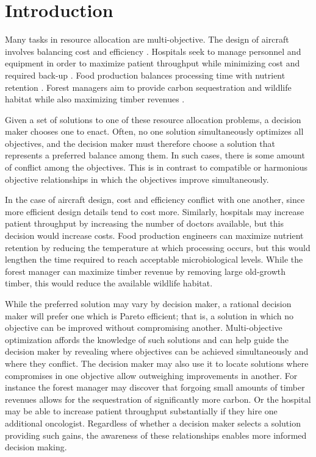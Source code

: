 
\section{Introduction}
\label{sec:intro}

Many tasks in resource allocation are multi-objective. The design of aircraft involves balancing cost and efficiency \cite{wang2014multi}. Hospitals seek to manage personnel and equipment in order to maximize patient throughput while minimizing cost and required back-up \cite{hutzschenreuter2009evolutionary}. Food production balances processing time with nutrient retention \cite{sendin2010efficient}. Forest managers aim to provide carbon sequestration and wildlife habitat while also maximizing timber revenues \cite{toth2013ecosel}.

Given a set of solutions to one of these resource allocation problems, a decision maker chooses one to enact. Often, no one solution simultaneously optimizes all objectives, and the decision maker must therefore choose a solution that represents a preferred balance among them. In such cases, there is some amount of conflict among the objectives. This is in contrast to compatible or harmonious objective relationships in which the objectives improve simultaneously.

In the case of aircraft design, cost and efficiency conflict with one another, since more efficient design details tend to cost more. Similarly, hospitals may increase patient throughput by increasing the number of doctors available, but this decision would increase costs. Food production engineers can maximize nutrient retention by reducing the temperature at which processing occurs, but this would lengthen the time required to reach acceptable microbiological levels. While the forest manager can maximize timber revenue by removing large old-growth timber, this would reduce the available wildlife habitat.

While the preferred solution may vary by decision maker, a rational decision maker will prefer one which is Pareto efficient; that is, a solution in which no objective can be improved without compromising another. Multi-objective optimization affords the knowledge of such solutions and can help guide the decision maker by revealing where objectives can be achieved simultaneously and where they conflict. The decision maker may also use it to locate solutions where compromises in one objective allow outweighing improvements in another. For instance the forest manager may discover that forgoing small amounts of timber revenues allows for the sequestration of significantly more carbon. Or the hospital may be able to increase patient throughput substantially if they hire one additional oncologist.
Regardless of whether a decision maker selects a solution providing such gains, the awareness of these relationships enables more informed decision making.

